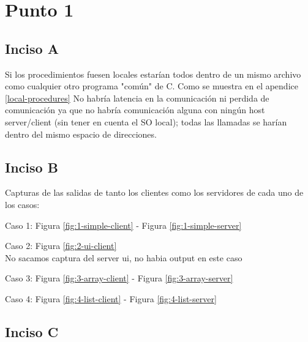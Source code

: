 \documentclass[12pt,journal,compsoc]{IEEEtran}
\begin{document}
%
\IEEEpeerreviewmaketitle

\section{Punto 1}
\subsection{Inciso A}
Si los procedimientos fuesen locales estarían todos dentro de un mismo archivo como cualquier otro programa "común" de C.
Como se muestra en el apendice \ref{local-procedures}
No habría latencia en la comunicación ni perdida de comunicación ya que no habría comunicación alguna con ningún host server/client (sin tener en cuenta el SO local); todas las llamadas se harían dentro del mismo espacio de direcciones.

\subsection{Inciso B}
Capturas de las salidas de tanto los clientes como los servidores de cada uno de los casos:

Caso 1: Figura \ref{fig:1-simple-client} - Figura \ref{fig:1-simple-server}

Caso 2: Figura \ref{fig:2-ui-client}\\
\indent No sacamos captura del server ui, no habia output en este caso

Caso 3: Figura \ref{fig:3-array-client} - Figura \ref{fig:3-array-server}

Caso 4: Figura \ref{fig:4-list-client} - Figura \ref{fig:4-list-server} 

\subsection{Inciso C}
\end{document}
